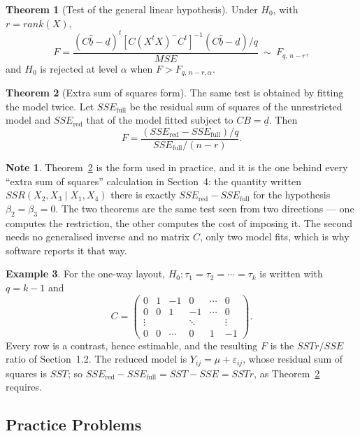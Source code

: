 \documentclass[11pt,a4paper]{article}
\theoremstyle{definition}
\newtheorem{thm}{Theorem}[subsection]
\newtheorem{exa}[thm]{Example}
\newtheorem*{note}{Note}
\begin{document}
\begin{thm}[Test of the general linear hypothesis]
\label{res:thm:glh}
Under $H_0$, with $r=rank(X)$,
$$F=\frac{\left(C\widehat{\underline{b}}-\underline{d}\right)^t
\left[C\left(X^tX\right)^{-}C^t\right]^{-1}
\left(C\widehat{\underline{b}}-\underline{d}\right)\big/q}{MSE}
\ \sim\ F_{q,\,n-r},$$
and $H_0$ is rejected at level $\alpha$ when $F>F_{q,\,n-r,\alpha}$.
\end{thm}

\begin{thm}[Extra sum of squares form]
\label{res:thm:extrass}
The same test is obtained by fitting the model twice. Let $SSE_{\text{full}}$
be the residual sum of squares of the unrestricted model and
$SSE_{\text{red}}$ that of the model fitted subject to $CB=\underline{d}$.
Then
$$F=\frac{\left(SSE_{\text{red}}-SSE_{\text{full}}\right)\big/q}
{SSE_{\text{full}}\big/(n-r)} .$$
\end{thm}

\begin{note}
Theorem~\ref{res:thm:extrass} is the form used in practice, and it is the one
behind every ``extra sum of squares'' calculation in Section~4: the quantity
written $SSR\left(X_2,X_3\mid X_1,X_4\right)$ there is exactly
$SSE_{\text{red}}-SSE_{\text{full}}$ for the hypothesis $\beta_2=\beta_3=0$.
The two theorems are the same test seen from two directions --- one computes
the restriction, the other computes the cost of imposing it. The second needs
no generalised inverse and no matrix $C$, only two model fits, which is why
software reports it that way.
\end{note}

\begin{exa}
For the one-way layout, $H_0:\tau_1=\tau_2=\cdots=\tau_k$ is written with
$q=k-1$ and
$$C=\begin{pmatrix}
0 & 1 & -1 & 0 & \cdots & 0\\
0 & 0 & 1 & -1 & \cdots & 0\\
\vdots & & & \ddots & & \vdots\\
0 & 0 & \cdots & 0 & 1 & -1
\end{pmatrix}.$$
Every row is a contrast, hence estimable, and the resulting $F$ is the
$SSTr/SSE$ ratio of Section~1.2. The reduced model is
$Y_{ij}=\mu+\varepsilon_{ij}$, whose residual sum of squares is $SST$; so
$SSE_{\text{red}}-SSE_{\text{full}}=SST-SSE=SSTr$, as
Theorem~\ref{res:thm:extrass} requires.
\end{exa}

\subsection{Practice Problems}
\end{document}
